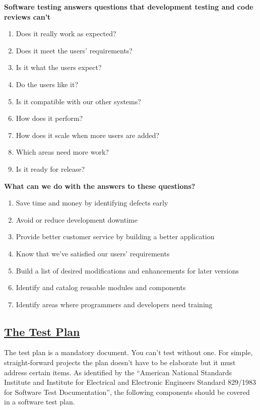 \noindent
\textbf{Software testing answers questions that development testing and code reviews can’t}
\begin{enumerate}
\item Does it really work as expected?
\item Does it meet the users’ requirements?
\item Is it what the users expect?
\item Do the users like it?
\item Is it compatible with our other systems?
\item How does it perform?
\item How does it scale when more users are added?
\item Which areas need more work?
\item Is it ready for release?
\end{enumerate}
\textbf{What can we do with the answers to these questions?}
\begin{enumerate}
\item Save time and money by identifying defects early
\item Avoid or reduce development downtime
\item Provide better customer service by building a better application
\item Know that we’ve satisfied our users’ requirements
\item Build a list of desired modifications and enhancements for later versions
\item Identify and catalog reusable modules and components
\item Identify areas where programmers and developers need training 
\end{enumerate}

\subsection*{\underline{The Test Plan}}
\noindent
\hspace{3em}
The test plan is a mandatory document. You can’t test without one. For simple, straight-forward projects the plan
doesn’t have to be elaborate but it must address certain items. As identified by the “American National Standards
Institute and Institute for Electrical and Electronic Engineers Standard 829/1983 for Software Test Documentation”,
the following components should be covered in a software test plan.\\
    

